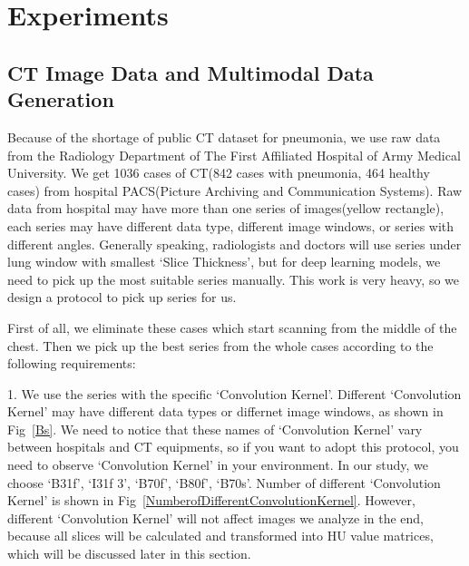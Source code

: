 \documentclass[journal]{IEEEtran}
\begin{document}
\section{Experiments}
\label{experiments}

\subsection{CT Image Data and Multimodal Data Generation}
\label{ctimagedata}
Because of the shortage of public CT dataset for pneumonia, we use raw data from the Radiology Department of The First Affiliated Hospital of Army Medical University. We get 1036 cases of CT(842 cases with pneumonia, 464 healthy cases) from hospital PACS(Picture Archiving and Communication Systems). Raw data from hospital may have more than one series of images(yellow rectangle), each series may have different data type, different image windows, or series with different angles. 
Generally speaking, radiologists and doctors will use series under lung window with smallest `Slice Thickness', but for deep learning models, we need to pick up the most suitable series manually. This work is very heavy, so we design a protocol to pick up series for us.

First of all, we eliminate these cases which start scanning from the middle of the chest. Then we pick up the best series from the whole cases according to the following requirements:

1. We use the series with the specific `Convolution Kernel'. Different `Convolution Kernel' may have different data types or differnet image windows, as shown in Fig~\ref{Bs}. We need to notice that these names of `Convolution Kernel' vary between hospitals and CT equipments, so if you want to adopt this protocol, you need to observe `Convolution Kernel' in your environment. In our study, we choose `B31f', `I31f 3', `B70f', `B80f', `B70s'. Number of different `Convolution Kernel' is shown in Fig~\ref{NumberofDifferentConvolutionKernel}. 
However, different `Convolution Kernel' will not affect images we analyze in the end, because all slices will be calculated and transformed into HU value matrices, which will be discussed later in this section.
\end{document}
